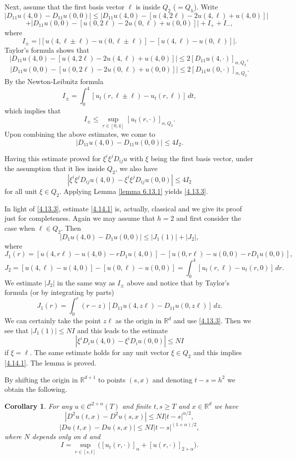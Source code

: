 \documentclass[reqno,12pt]{amsart}
\newtheorem{corollary}[theorem]{Corollary}
\theoremstyle{definition}
\theoremstyle{remark}
\begin{document}
  Next,   assume that the first basis vector $\ell$
is inside $Q_2$ ($=Q_{h}$). Write
$$
|D_{11} u(4,0)-D_{11}u(0,0)|   \le   |D_{11} u(4,0)-[u(4,
2\ell)-2u(4,\ell)+u(4,0)   ] |
$$
$$
+|D_{11} u(0,0)-[u(0 , 2\ell)-2u(0,\ell)+u(0,0) ] |+I_{+}+I_{-},
$$
where
$$
I_{\pm}=|[u(4, \ell \pm\ell)-u(0, \ell \pm\ell)]-
[u(4,\ell)-u(0,\ell)]|.
$$
Taylor's formula shows that
$$
|D_{11} u(4,0)-[u(4, 2\ell)-2u(4,\ell)+u(4,0)   ]  | \leq 2
     [D_{11}u(4,\cdot)]_{ \alpha , Q_{2} },
$$
$$
   |D_{11} u(0,0)-[u(0 , 2\ell)-2u(0,\ell)+u(0,0) ]|
  \leq 2
     [D_{11}u(0,\cdot)]_{ \alpha , Q_{2} }.
$$
By the Newton-Leibnitz formula
$$
I_{\pm} =\int_{0}^{4}[u_{t}(r,\ell \pm\ell)-u_{t}(r, \ell )]\,dt,
$$ which implies
that
$$
I_{\pm}\leq\sup_{r\in[0,4]}[u_{t}(r,\cdot)]_{{{\alpha}, Q_{2}}}.
$$
Upon combining the above estimates,  we come to
$$
|D_{11}u(4,0)-D_{11}u(0,0)|\leq 4I_{2}.
$$

Having this estimate proved for  $\xi^{i}\xi^{j}D_{ij}u$ with
$\xi$ being the first basis vector, under the assumption that it
lies inside $Q_{2}$, we also have
  $$
|\xi^{i}\xi^{j}D_{ij}u(4,0)-\xi^{i}\xi^{j}D_{ij}u(0,0)| \leq
4I_{2}
$$
for all unit $\xi\in Q_{2}$. Applying Lemma \ref{lemma 6.13.1}
yields \eqref{4.13.3}.

In light of \eqref{4.13.3},
estimate \eqref{4.14.1} is, actually, classical and we give its
proof just for completeness. 
Again we may assume that $h=2$ and first consider the case when
$\ell\in Q_{2}$. Then
$$
|D_{1}u(4,0)-D_{1}u(0,0)|\leq |J_{1}(1)|+|J_{2}|,
$$
where
$$
J_{1}(r)=[u(4,r\ell)-u(4,0)-rD_{1}u(4,0)]
-[u(0,r\ell)-u(0,0)-rD_{1}u(0,0)],
$$
$$
J_{2}=[u(4, \ell)-u(4,0)]-[u(0, \ell)-u(0,0)]=\int_{0}^{4}
[u_{t}(r,\ell)-u_{t}(r,0)]\,dr.
$$
We estimate $|J_{2}|$ in the same way as $I_{\pm}$ above and
notice that by Taylor's formula (or by integrating by parts)
$$
J_{1}(r)=\int_{0}^{r}(r-z)[D_{11}u(4,z\ell)-
D_{11}u(0,z\ell)]\,dz.
$$
We can certainly take the point $z\ell$ as the origin in
${\mathbb{R}}^{d}$ and use \eqref{4.13.3}. Then we see that $|J_{1}(1)|\leq
NI$ and this leads to the estimate
$$
|\xi^{i}D_{i}u(4,0)-\xi^{i}D_{i}u(0,0)|\leq NI
$$
if $\xi=\ell$. The same estimate holds for any unit vector $\xi\in
Q_{2}$ and this implies \eqref{4.14.1}. The lemma is proved.

By shifting the origin in ${\mathbb{R}}^{d+1}$ to points $(s,x)$ and
denoting $t-s=h^{2}$ we obtain the following.

\begin{corollary}

                                        \label{corollary 4.13.2}
For any  $u\in{\mathcal{C}}^{2+\alpha}(T)$ and finite $t,s\geq T$ and
$x\in{\mathbb{R}}^{d}$ we have
\begin{equation}
                                             \label{6.14.3}
|D^{2}u(t,x)-D^{2}u(s,x)|\leq N I|t-s|^{\alpha/2},
\end{equation}
$$
|D u(t,x)-D u(s,x)|\leq N I|t-s|^{(1+\alpha)/2},
$$
where $N$ depends only on $d$ and
$$
I=\sup_{r\in[s,t]} \big([u_{t}(r,\cdot)]_{\alpha} +[u
(r,\cdot)]_{2+\alpha}\big).
$$
\end{corollary}
\end{document}
